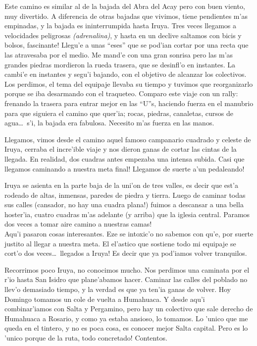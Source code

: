 Este camino es similar al de la bajada del Abra del Acay pero con buen viento,
muy divertido. A diferencia de otras bajadas que vivimos, tiene pendientes m'as
empinadas, y la bajada es ininterrumpida hasta Iruya. Tres veces llegamos a
velocidades peligrosas {\sl (adrenalina)}, y hasta en un declive saltamos con
bicis y bolsos, \textexclamdown fascinante! Llegu'e a unas ``eses'' que se
pod'ian cortar por una recta que las atravesaba por el medio. Me mand'e con una
gran sonrisa pero las m'as grandes piedras mordieron la rueda trasera, que se
desinfl'o en instantes. La cambi'e en instantes y segu'i bajando, con el
objetivo de alcanzar los colectivos. Los perdimos, el tema del equipaje llevaba
su tiempo y tuvimos que reorganizarlo porque se iba desarmando con el traqueteo.
Comparo este viaje con un rally: frenando la trasera para entrar mejor en las
``U''s, haciendo fuerza en el manubrio para que siguiera el camino que quer'ia;
rocas, piedras, canaletas, cursos de agua\ldots\ s'i, la bajada era fabulosa.
Necesito m'as fuerza en las manos.

Llegamos, vimos desde el camino aquel famoso campanario cuadrado y celeste de
Iruya, cerraba el incre'ible viaje y nos dieron ganas de cortar las cintas de la
llegada. En realidad, dos cuadras antes empezaba una intensa subida.
\textexclamdown Casi que llegamos caminando a nuestra meta final!
\textexclamdown Llegamos de suerte a'un pedaleando!

Iruya se asienta en la parte baja de la uni'on de tres valles, es decir que
est'a rodeado de altas, inmensas, paredes de piedra y tierra. Luego de caminar
todas sus calles (cansador, \textexclamdown no hay una cuadra plana!) fuimos a
descansar a una bella hoster'ia, cuatro cuadras m'as adelante (y arriba) que la
iglesia central. \textexclamdown Paramos dos veces a tomar aire camino a
nuestras camas!\\

Aqu'i pasaron cosas interesantes. Eze se intoxic'o no sabemos con qu'e, por
suerte justito al llegar a nuestra meta. El el'astico que sostiene todo mi
equipaje se cort'o dos veces\ldots\ \textexclamdown llegados a Iruya! Es decir
que ya pod'iamos volver tranquilos.

Recorrimos poco Iruya, no conocimos mucho. Nos perdimos una caminata por el r'io
hasta San Isidro que plane'abamos hacer. Caminar las calles del poblado no
llev'o demasiado tiempo, y la verdad es que ya ten'ia ganas de volver. Hoy
Domingo tomamos un cole de vuelta a Humahuaca. Y desde aqu'i combinar'iamos con
Salta y Pergamino, pero hay un colectivo que sale derecho de Humahuaca a
Rosario, y como ya estaba ansioso, lo tomamos. Lo 'unico que me queda en el
tintero, y no es poca cosa, es conocer mejor Salta capital. Pero es lo 'unico
porque de la ruta, \textexclamdown todo concretado! Contentos.

